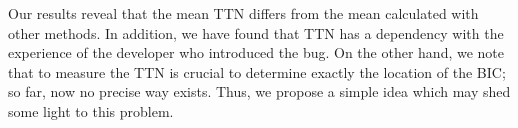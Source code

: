 \documentclass[10pt, conference]{IEEEtran}
\begin{document}




Our results reveal that the mean TTN differs from the mean calculated with other methods. In addition, we have found that TTN has a dependency with the experience of the developer who introduced the bug. On the other hand, we note that to measure the TTN is crucial to determine exactly the location of the BIC; so far, now no precise way exists. Thus, we propose a simple idea which may shed some light to this problem.

\end{document}
